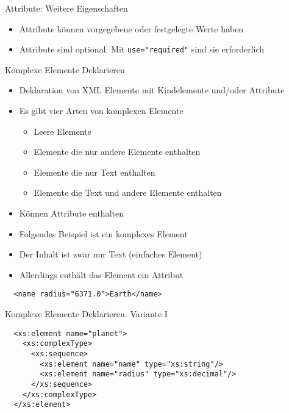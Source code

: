 \documentclass{beamer}
\begin{document}
\begin{frame}[fragile]{Attribute: Weitere Eigenschaften}
	
	\begin{itemize}
	\item Attribute können vorgegebene oder festgelegte Werte haben
	\item Attribute sind optional: Mit \texttt{use="required"} sind sie erforderlich
	\end{itemize}
	
\end{frame}

\begin{frame}[fragile]{Komplexe Elemente Deklarieren}
	
	\begin{itemize}
		\item Deklaration von XML Elemente mit Kindelemente und/oder Attribute
		\item Es gibt vier Arten von komplexen Elemente
		\begin{itemize}
			\item Leere Elemente
			\item Elemente die nur andere Elemente enthalten
			\item Elemente die nur Text enthalten
			\item Elemente die Text und andere Elemente enthalten
		\end{itemize}
		\item Können Attribute enthalten
		\item Folgendes Beispiel ist ein komplexes Element
		\item Der Inhalt ist zwar nur Text (einfaches Element)
		\item Allerdings enthält das Element ein Attribut
	\end{itemize}
	
	\lstset{language=XML}
	\begin{lstlisting}	
  <name radius="6371.0">Earth</name>
	\end{lstlisting}
	
\end{frame}

\begin{frame}[fragile]{Komplexe Elemente Deklarieren: Variante I}
	
	\lstset{language=XML}
	\begin{lstlisting}	
  <xs:element name="planet">
    <xs:complexType>
      <xs:sequence>
        <xs:element name="name" type="xs:string"/>
        <xs:element name="radius" type="xs:decimal"/>
      </xs:sequence>
    </xs:complexType>
  </xs:element>
	\end{lstlisting}
	
\end{frame}
\end{document}
